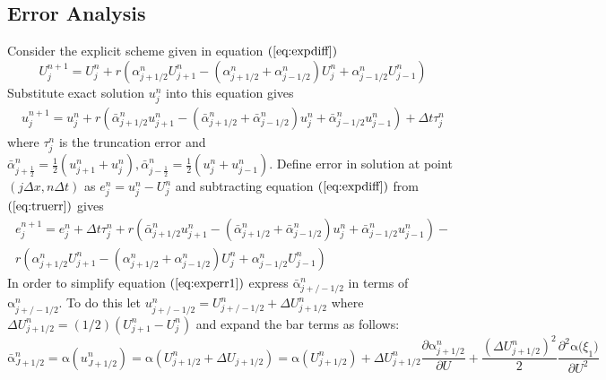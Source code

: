\documentclass[11pt]{article}
\newcommand{\pl}{\partial}
\newcommand{\D}{\Delta}
\newcommand{\al}{\mathrm{\alpha}}
\begin{document}
\subsection{Error Analysis}
Consider the explicit scheme given in equation $(\ref{eq:expdiff})$
\begin{equation*}
U_j^{n+1} = U_j^n + r(\alpha_{j+1/2}^nU_{j+1}^n - (\alpha_{j+1/2}^n+\alpha_{j-1/2}^n)U_j^n+\alpha_{j-1/2}^nU_{j-1}^n)
\end{equation*}
Substitute exact solution $u_j^n$ into this equation gives 
\begin{equation}
\label{eq:truerr}
\begin{split}
u_j^{n+1} = u_j^n + r( \bar{\alpha}_{j+1/2}^nu_{j+1}^n -
 (\bar{\alpha}_{j+1/2}^n+\bar{\alpha}_{j-1/2}^n)u_j^n+
 \bar{\alpha}_{j-1/2}^nu_{j-1}^n) + \D{t}\tau_j^n
\end{split}
\end{equation}
where $\tau_j^n$ is the truncation error and  $ \bar{\alpha}^n_{j+\frac{1}{2}} = \frac{1}{2}( u^n_{j+1}+u^n_j), \bar{\alpha}^n_{j-\frac{1}{2}} = \frac{1}{2}( u^n_{j}+u^n_{j-1})$.
Define error in solution at point $(j\D{x},n\D{t})$ as $e_j^n = u_j^n-U_j^n$ and subtracting equation $(\ref{eq:expdiff})$ from $(\ref{eq:truerr})$ gives
\begin{equation}
\label{eq:experr1}
\begin{split}
e_j^{n+1} = e_j^n + \D{t}\tau_j^n +   r( \bar{\alpha}_{j+1/2}^nu_{j+1}^n - (\bar{\alpha}_{j+1/2}^n+\bar{\alpha}_{j-1/2}^n)u_j^n+\bar{\alpha}_{j-1/2}^nu_{j-1}^n) - \\ r(\alpha_{j+1/2}^nU_{j+1}^n - (\alpha_{j+1/2}^n+\alpha_{j-1/2}^n)U_j^n+\alpha_{j-1/2}^nU_{j-1}^n) 
\end{split}
\end{equation}
In order to simplify equation $( \ref{eq:experr1})$ express $ \bar{\al}_{j+/-1/2}^n$ in terms of $\al_{j+/-1/2}^n$. 
To do this let $u_{j+/-1/2}^n = U_{j+/-1/2}^n +\D{U_{j+1/2}^n}$ 
where $\D{U_{j+1/2}^n} = (1/2)(U_{j+1}^n-U_j^n)$ and expand the bar terms as follows:\\
\begin{equation*}
\bar{\al}_{J+1/2}^n = \al(u_{J+1/2}^n) = \al(U_{j+1/2}^n + \D{U_{j+1/2}}) = \al(U_{j+1/2}^n)  + \D{U_{j+1/2}^n}\frac{ \pl{\al_{ j+1/2}^n } } { \pl{U} } + 
  \frac{(\D{U_{j+1/2}^n})^2}{2}\frac{ \pl^2{\al(\xi }_1 )} { \pl{U}^2 }
\end{equation*}
\end{document}

